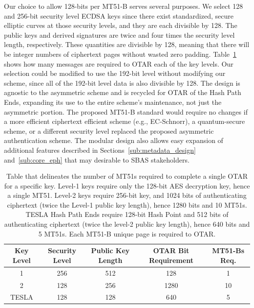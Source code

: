 \documentclass[letterpaper,times]{IONconf/IONconf}
\begin{document}
	Our choice to allow 128-bits per MT51-B serves several purposes.
	We select 128 and 256-bit security level ECDSA keys since there exist standardized, secure elliptic curves at those security levels, and they are each divisible by 128.
	The public keys and derived signatures are twice and four times the security level length, respectively.
	These quantities are divisible by 128, meaning that there will be integer numbers of ciphertext pages without wasted zero padding.
	Table~\ref{tab: ciphertext lengths} shows how many messages are required to OTAR each of the key levels.
	Our selection could be modified to use the 192-bit level without modifying our scheme, since all of the 192-bit level data is also divisible by 128.
	The design is agnostic to the asymmetric scheme and is recycled for OTAR of the Hash Path Ends, expanding its use to the entire scheme's maintenance, not just the asymmetric portion.
	The proposed MT51-B standard would require no changes if a more efficient ciphertext efficient scheme (e.g., EC-Schnorr), a quantum-secure scheme, or a different security level replaced the proposed asymmetric authentication scheme.
	The modular design also allows easy expansion of additional features described in Sections~\ref{sub:metadata_design} and~\ref{sub:core_eph} that may desirable to SBAS stakeholders.
		\begin{table}[H]
		\center
		\begin{tabular}{|c|c|c|c|c|} \hline
			Key Level & Security Level & Public Key Length & OTAR Bit Requirement & MT51-Bs Req. \\ \hline
			    1 & 256 & 512 &  128 & 1 \\ \hline
			    2 & 128 & 256 & 1280 & 10\\ \hline
			TESLA & 128 & 128 &  640 & 5 \\ \hline
		\end{tabular}
		\caption{Table that delineates the number of MT51s required to complete a single OTAR for a specific key. Level-1 keys require only the 128-bit AES decryption key, hence a single MT51. Level-2 keys require 256-bit key, and 1024 bits of authenticating ciphertext (twice the Level-1 public key length), hence 1280 bits and 10 MT51s. TESLA Hash Path Ends require 128-bit Hash Point and 512 bits of authenticating ciphertext (twice the level-2 public key length), hence 640 bits and 5 MT51s. Each MT51-B unique page is required to OTAR.}
		\label{tab: ciphertext lengths}
	\end{table}
\end{document}
